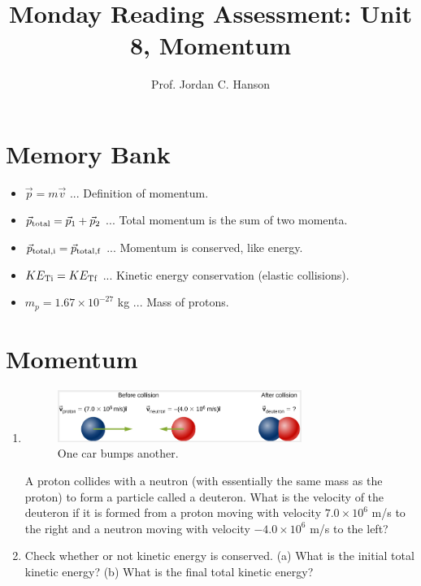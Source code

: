 \documentclass{article}
\begin{document}
\title{Monday Reading Assessment: Unit 8, Momentum}
\author{Prof. Jordan C. Hanson}

\maketitle

\section{Memory Bank}

\begin{itemize}
\item $\vec{p} = m\vec{v}$ ... Definition of momentum.
\item $\vec{p}_{\rm total} = \vec{p}_1 + \vec{p}_2$ ... Total momentum is the sum of two momenta.
\item $\vec{p}_{\rm total,i} = \vec{p}_{\rm total,f}$ ... Momentum is conserved, like energy.
\item $KE_{\rm Ti} = KE_{\rm Tf}$ ... Kinetic energy conservation (elastic collisions).
\item $m_p = 1.67 \times 10^{-27}$ kg ... Mass of protons.
\end{itemize}

\section{Momentum}

\begin{enumerate}
\item
\begin{figure}[ht]
\centering
\includegraphics[width=0.75\textwidth]{deuteron.png}
\caption{\label{fig:deu} One car bumps another.}
\end{figure}
A proton collides with a neutron (with essentially the same mass as the proton) to form a particle called a deuteron. What is the velocity of the deuteron if it is formed from a proton moving with velocity $7.0 \times 10^{6}$ m/s to the right and a neutron moving with velocity $-4.0 \times 10^{6}$ m/s to the left? \\ \vspace{2cm}
\item Check whether or not kinetic energy is conserved.  (a) What is the initial total kinetic energy? (b) What is the final total kinetic energy?
\end{enumerate}
\end{document}

